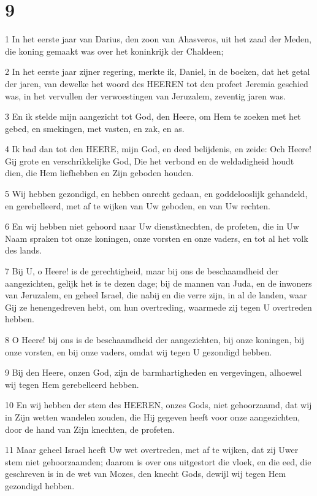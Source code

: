 \chapter{9}

\par 1 In het eerste jaar van Darius, den zoon van Ahasveros, uit het zaad der Meden, die koning gemaakt was over het koninkrijk der Chaldeen;
\par 2 In het eerste jaar zijner regering, merkte ik, Daniel, in de boeken, dat het getal der jaren, van dewelke het woord des HEEREN tot den profeet Jeremia geschied was, in het vervullen der verwoestingen van Jeruzalem, zeventig jaren was.
\par 3 En ik stelde mijn aangezicht tot God, den Heere, om Hem te zoeken met het gebed, en smekingen, met vasten, en zak, en as.
\par 4 Ik bad dan tot den HEERE, mijn God, en deed belijdenis, en zeide: Och Heere! Gij grote en verschrikkelijke God, Die het verbond en de weldadigheid houdt dien, die Hem liefhebben en Zijn geboden houden.
\par 5 Wij hebben gezondigd, en hebben onrecht gedaan, en goddelooslijk gehandeld, en gerebelleerd, met af te wijken van Uw geboden, en van Uw rechten.
\par 6 En wij hebben niet gehoord naar Uw dienstknechten, de profeten, die in Uw Naam spraken tot onze koningen, onze vorsten en onze vaders, en tot al het volk des lands.
\par 7 Bij U, o Heere! is de gerechtigheid, maar bij ons de beschaamdheid der aangezichten, gelijk het is te dezen dage; bij de mannen van Juda, en de inwoners van Jeruzalem, en geheel Israel, die nabij en die verre zijn, in al de landen, waar Gij ze henengedreven hebt, om hun overtreding, waarmede zij tegen U overtreden hebben.
\par 8 O Heere! bij ons is de beschaamdheid der aangezichten, bij onze koningen, bij onze vorsten, en bij onze vaders, omdat wij tegen U gezondigd hebben.
\par 9 Bij den Heere, onzen God, zijn de barmhartigheden en vergevingen, alhoewel wij tegen Hem gerebelleerd hebben.
\par 10 En wij hebben der stem des HEEREN, onzes Gods, niet gehoorzaamd, dat wij in Zijn wetten wandelen zouden, die Hij gegeven heeft voor onze aangezichten, door de hand van Zijn knechten, de profeten.
\par 11 Maar geheel Israel heeft Uw wet overtreden, met af te wijken, dat zij Uwer stem niet gehoorzaamden; daarom is over ons uitgestort die vloek, en die eed, die geschreven is in de wet van Mozes, den knecht Gods, dewijl wij tegen Hem gezondigd hebben.
